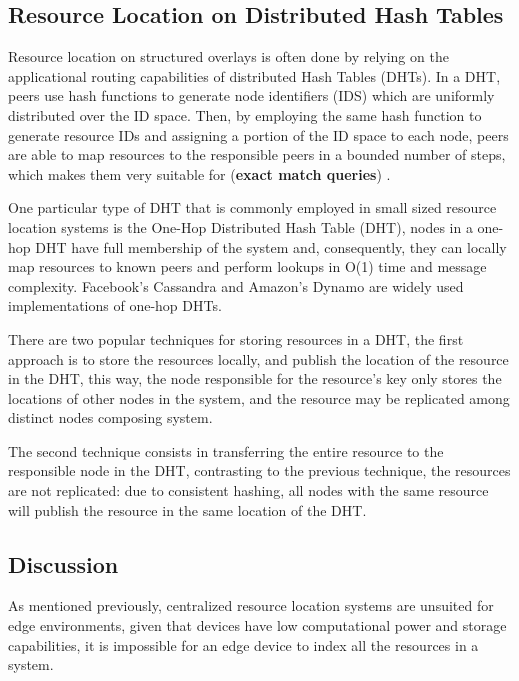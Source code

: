 \subsection{Resource Location on Distributed Hash Tables}

Resource location on structured overlays is often done by relying on the applicational routing capabilities of distributed Hash Tables (DHTs). In a DHT, peers use hash functions to generate node identifiers (IDS) which are uniformly distributed over the ID space. Then, by employing the same hash function to generate resource IDs and assigning a portion of the ID space to each node, peers are able to map resources to the responsible peers in a bounded number of steps, which makes them very suitable for (\textbf{exact match queries}) \cite{leitaoPHDthesis}. 

One particular type of DHT that is commonly employed in small sized resource location systems is the One-Hop Distributed Hash Table (DHT), nodes in a one-hop DHT have full membership of the system and, consequently, they can locally map resources to known peers and perform lookups in O(1) time and message complexity. Facebook's Cassandra \cite{lakshman2010cassandra} and Amazon's Dynamo \cite{decandia2007dynamo} are widely used implementations of one-hop DHTs. 

There are two popular techniques for storing resources in a DHT, the first approach is to store the resources locally, and publish the location of the resource in the DHT, this way, the node responsible for the resource's key only stores the locations of other nodes in the system, and the resource may be replicated among distinct nodes composing system. 

The second technique consists in transferring the entire resource to the responsible node in the DHT, contrasting to the previous technique, the resources are not replicated: due to consistent hashing, all nodes with the same resource will publish the resource in the same location of the DHT. 

\subsection{Discussion}

As mentioned previously, centralized resource location systems are unsuited for edge environments, given that devices have low computational power and storage capabilities, it is impossible for an edge device to index all the resources in a system.

